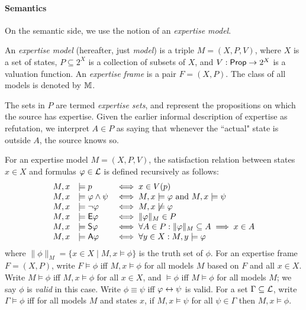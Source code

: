 \paragraph{Semantics}

On the semantic side, we use the notion of an \emph{expertise model}.

\begin{definition}
    \label{exp_def_expertise_model}

    An \emph{expertise model} (hereafter, just \emph{model})
    is a triple $M = (X, P, V)$, where $X$ is a set
    of states, $P \subseteq 2^X$ is a collection of subsets of $X$, and $V:
    \mathsf{Prop} \to 2^X$ is a valuation function. An \emph{expertise frame} is a pair
    $F = (X, P)$.  The class of all models is denoted by $\mathbb{M}$.

\end{definition}

The sets in $P$ are termed \emph{expertise sets}, and represent the
propositions on which the source has expertise. Given the earlier informal
description of expertise as refutation, we interpret $A \in P$ as saying
that whenever the ``actual" state is outside $A$, the source knows so.

For an expertise model $M = (X, P, V)$, the satisfaction relation between
states $x \in X$ and formulas $\varphi \in \mathcal{L}$ is defined recursively
as follows:
\[
    \begin{array}{lll}
     M, x &\models p &\iff x \in V(p) \\
     M, x &\models \varphi \land \psi &\iff M, x \models \varphi \text{ and } M, x
         \models \psi \\
     M, x &\models \neg\varphi &\iff M, x \not\models \varphi \\
     M, x &\models \mathsf{E}\varphi &\iff \|\varphi\|_M \in P \\
     M, x &\models \mathsf{S}\varphi &\iff \forall A \in P: \|\varphi\|_M \subseteq A \implies
         x \in A \\
     M, x &\models \mathsf{A}\varphi &\iff \forall y \in X: M, y \models \varphi
    \end{array}
\]
where $\|\phi\|_M = \{x \in X \mid M, x \models \phi\}$ is the truth set
of $\phi$. For an expertise frame $F = (X, P)$, write $F
\models \phi$ iff $M, x \models \phi$ for all models $M$ based on
$F$ and all $x \in X$. Write $M \models \phi$ iff
$M, x \models \phi$ for all $x \in X$, and $\models \phi$ iff
$M \models \phi$ for all models $M$; we say $\phi$ is \emph{valid}
in this case. Write $\phi \equiv \psi$ iff $\varphi \leftrightarrow \psi$ is
valid. For a set $\Gamma \subseteq \mathcal{L}$, write $\Gamma \models
\phi$ iff for all models $M$ and states $x$, if $M, x \models
\psi$ for all $\psi \in \Gamma$ then $M, x \models \phi$.

